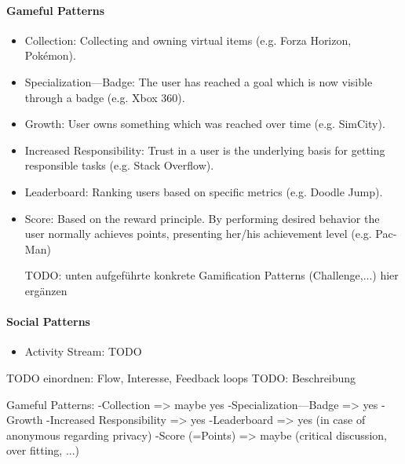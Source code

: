 \paragraph*{Gameful Patterns}
\begin{itemize}
	\item Collection: Collecting and owning virtual items (e.g. Forza Horizon, Pokémon). \cite[p. 4, 35]{lewisIrresistibleAppsMotivational2014}
	\item Specialization—Badge: The user has reached a goal which is now visible through a badge (e.g. Xbox 360). \cite[p. 4, 37]{lewisIrresistibleAppsMotivational2014}
	\item Growth: User owns something which was reached over time (e.g. SimCity). \cite[p. 4, 40]{lewisIrresistibleAppsMotivational2014}
	\item Increased Responsibility: Trust in a user is the underlying basis for getting responsible tasks (e.g. Stack Overflow). \cite[p. 4, 41]{lewisIrresistibleAppsMotivational2014}
	\item Leaderboard: Ranking users based on specific metrics (e.g. Doodle Jump). \cite[p. 4, 44]{lewisIrresistibleAppsMotivational2014}
	\item Score: Based on the reward principle. By performing desired behavior the user normally achieves points, presenting her/his achievement level (e.g. Pac-Man) \cite[p. 4, 46]{lewisIrresistibleAppsMotivational2014}
	
	TODO: unten aufgeführte konkrete Gamification Patterns (Challenge,...) hier ergänzen
\end{itemize}

\paragraph*{Social Patterns}
\begin{itemize}
	\item Activity Stream: TODO
\end{itemize}
	
	
TODO einordnen: Flow, Interesse, Feedback loops \newline
TODO: Beschreibung \cite[p. 19, 20, 21]{bierhoffeditorEnzyklopaediePsychologieSoziale2016}

Gameful Patterns:
-Collection => maybe yes
-Specialization—Badge => yes
-Growth
-Increased Responsibility => yes
-Leaderboard => yes (in case of anonymous regarding privacy)
-Score (=Points) => maybe (critical discussion, over fitting, ...)

